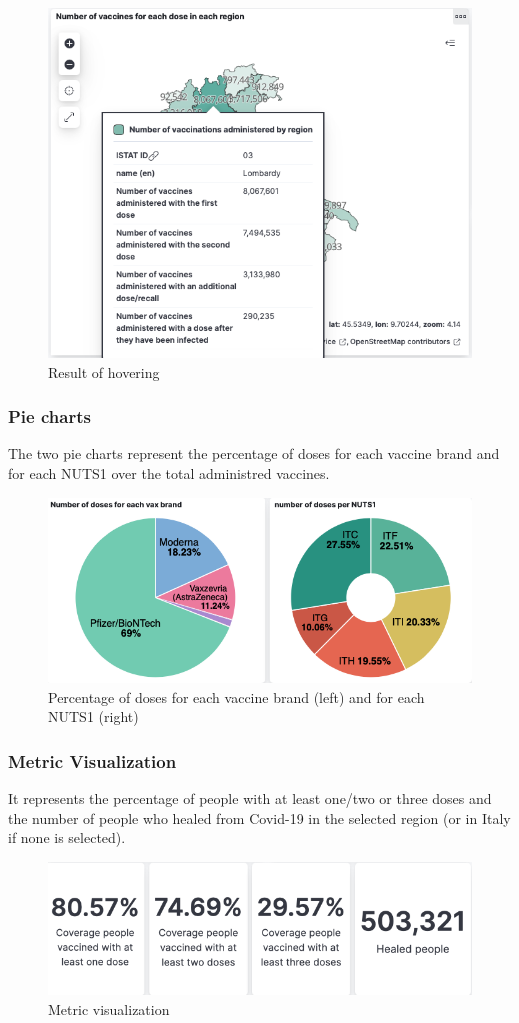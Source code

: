 \documentclass[12pt, a4paper]{article}
\begin{document}
\begin{figure}[H]
  \centering
  \includegraphics[width=.8\linewidth]{img (5).png}
\caption*{Result of hovering}
\end{figure}

\subsubsection{Pie charts}
The two pie charts represent the percentage of doses for each vaccine brand and for each NUTS1 over the total administred vaccines.
\begin{figure}[H]
  \centering
  \includegraphics[width=1\linewidth]{img (7).png}
\caption*{Percentage of doses for each vaccine brand  (left) and for each NUTS1 (right)}
\end{figure}

\subsubsection{Metric Visualization}
It represents the percentage of people with at least one/two or three doses and the 
number of people who healed from Covid-19 in the selected region (or in Italy if none 
is selected).
\begin{figure}[H]
  \centering
  \includegraphics[width=.8\linewidth]{img (8).png}
\caption*{Metric visualization}
\end{figure}
\end{document}
